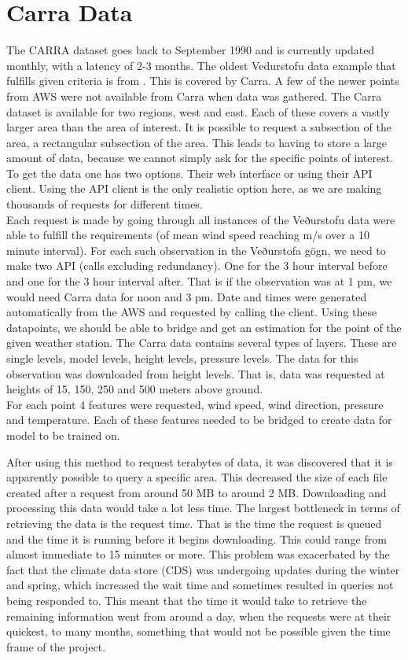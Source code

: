 \section{Carra Data}
The CARRA dataset goes back to September 1990 and is currently updated monthly, with a latency of 2-3 months. The oldest Vedurstofu data example that fulfills given criteria is from \startDateVedur. This is covered by Carra. A few of the newer points from AWS were not available from Carra when data was gathered. The Carra dataset is available for two regions, west and east. Each of these covers a vastly larger area than the area of interest. It is possible to request a subsection of the area, a rectangular subsection of the area. This leads to having to store a large amount of data, because we cannot simply ask for the specific points of interest. To get the data one has two options. Their web interface or using their API client. Using the API client is the only realistic option here, as we are making thousands of requests for different times.\\

Each request is made by going through all instances of the Veðurstofu data were able to fulfill the requirements (of mean wind speed reaching \averageWindSpeedLimit 
m/s over a 10 minute interval). For each such observation in the Veðurstofa gögn, we need to make two API (calls excluding redundancy). One for the 3 hour interval before and one for the 3 hour interval after. That is if the observation was at 1 pm, we would need Carra data for noon and 3 pm. Date and times were generated automatically from the AWS and requested by calling the client. Using these datapoints, we should be able to bridge and get an estimation for the point of the given weather station. The Carra data contains several types of layers. These are single levels, model levels, height levels, pressure levels. The data for this observation was downloaded from height levels. That is, data was requested at heights of 15, 150, 250 and 500 meters above ground.\\

For each point 4 features were requested, wind speed, wind direction, pressure and temperature. Each of these features needed to be bridged to create data for model to be trained on.

After using this method to request terabytes of data, it was discovered that it is apparently possible to query a specific area. This decreased the size of each file created after a request from around 50 MB to around 2 MB. Downloading and processing this data would take a lot less time. The largest bottleneck in terms of retrieving the data is the request time. That is the time the request is queued and the time it is running before it begins downloading. This could range from almost immediate to 15 minutes or more. This problem was exacerbated by the fact that the climate data store (CDS) was undergoing updates during the winter and spring, which increased the wait time and sometimes resulted in queries not being responded to. This meant that the time it would take to retrieve the remaining information went from around a day, when the requests were at their quickest, to many months, something that would not be possible given the time frame of the project.

